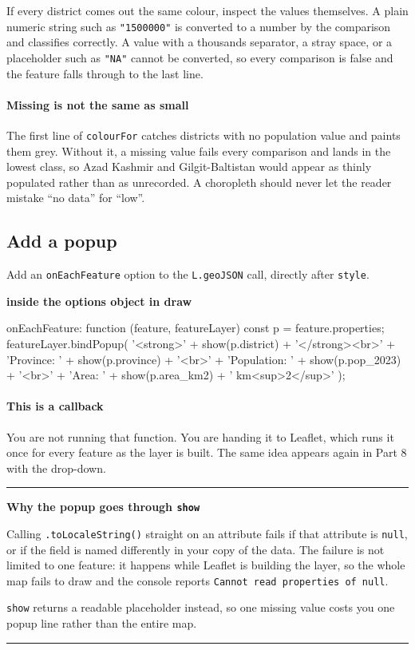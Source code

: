 \documentclass{article}
\newcommand{\cd}[1]{\texttt{#1}}
\newcommand{\codecap}[1]{%
  \par\vspace{.9em}\noindent\textbf{#1}\par\vspace{-.6em}}
\newenvironment{keypoint}[1]
  {\par\vspace{.7em}\noindent\rule{\linewidth}{.6pt}\par\vspace{.15em}
   \noindent\textbf{#1}\par\nobreak\vspace{-.3em}}
  {\par\vspace{.15em}\noindent\rule{\linewidth}{.6pt}\par\vspace{.7em}}
\begin{document}
If every district comes out the same colour, inspect the values
themselves. A plain numeric string such as \cd{"1500000"} is converted to
a number by the comparison and classifies correctly. A value with a
thousands separator, a stray space, or a placeholder such as \cd{"NA"}
cannot be converted, so every comparison is false and the feature falls
through to the last line.

\paragraph{Missing is not the same as small}
The first line of \cd{colourFor} catches districts with no population
value and paints them grey. Without it, a missing value fails every
comparison and lands in the lowest class, so Azad Kashmir and
Gilgit-Baltistan would appear as thinly populated rather than as
unrecorded. A choropleth should never let the reader mistake ``no data''
for ``low''.


\subsection{Add a popup}

Add an \cd{onEachFeature} option to the \cd{L.geoJSON} call, directly
after \cd{style}.

\codecap{inside the options object in draw}
\begin{code}
      onEachFeature: function (feature, featureLayer) {
        const p = feature.properties;
        featureLayer.bindPopup(
          '<strong>' + show(p.district) + '</strong><br>' +
          'Province: ' + show(p.province) + '<br>' +
          'Population: ' + show(p.pop_2023) + '<br>' +
          'Area: ' + show(p.area_km2) + ' km<sup>2</sup>'
        );
      }
\end{code}

\paragraph{This is a callback}
You are not running that function. You are handing it to Leaflet, which
runs it once for every feature as the layer is built. The same idea
appears again in Part 8 with the drop-down.


\begin{keypoint}{Why the popup goes through \texttt{show}}
Calling \cd{.toLocaleString()} straight on an attribute fails if that
attribute is \cd{null}, or if the field is named differently in your copy
of the data. The failure is not limited to one feature: it happens while
Leaflet is building the layer, so the whole map fails to draw and the
console reports \cd{Cannot read properties of null}.

\cd{show} returns a readable placeholder instead, so one missing value
costs you one popup line rather than the entire map.
\end{keypoint}
\end{document}
